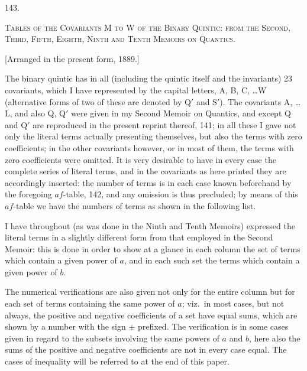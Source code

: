 \documentclass[11pt,a4paper]{book}
\begin{document}
\clearpage
\setcounter{page}{282}

\begin{center}
\textsc{143.}
\end{center}

\begin{center}
\textsc{Tables of the Covariants M to W of the Binary Quintic: from the Second, Third, Fifth, Eighth, Ninth and Tenth Memoirs on Quantics.}
\end{center}

\begin{center}
[Arranged in the present form, 1889.]
\end{center}

The binary quintic has in all (including the quintic itself and the invariants) 23 covariants, which I have represented by the capital letters, A, B, C, \ldots W (alternative forms of two of these are denoted by Q$'$ and S$'$). The covariants A, \ldots L, and also Q, Q$'$ were given in my Second Memoir on Quantics, and except Q and Q$'$ are reproduced in the present reprint thereof, 141; in all these I gave not only the literal terms actually presenting themselves, but also the terms with zero coefficients; in the other covariants however, or in most of them, the terms with zero coefficients were omitted. It is very desirable to have in every case the complete series of literal terms, and in the covariants as here printed they are accordingly inserted: the number of terms is in each case known beforehand by the foregoing $af$-table, 142, and any omission is thus precluded; by means of this $af$-table we have the numbers of terms as shown in the following list.

I have throughout (as was done in the Ninth and Tenth Memoirs) expressed the literal terms in a slightly different form from that employed in the Second Memoir: this is done in order to show at a glance in each column the set of terms which contain a given power of $a$, and in each such set the terms which contain a given power of $b$.

The numerical verifications are also given not only for the entire column but for each set of terms containing the same power of $a$; viz.\ in most cases, but not always, the positive and negative coefficients of a set have equal sums, which are shown by a number with the sign $\pm$ prefixed. The verification is in some cases given in regard to the subsets involving the same powers of $a$ and $b$, here also the sums of the positive and negative coefficients are not in every case equal. The cases of inequality will be referred to at the end of this paper.
\end{document}

